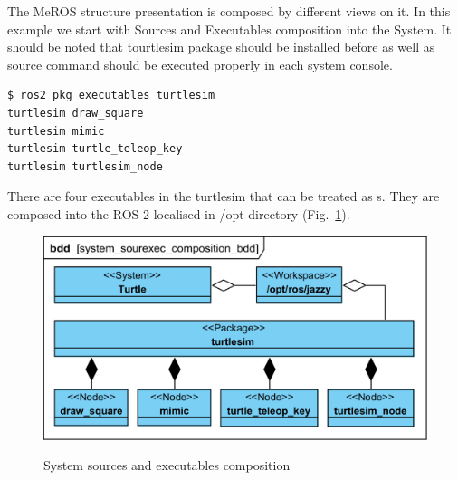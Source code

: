 \documentclass[11pt,oneside,a4paper]{report}
\begin{document}
The MeROS \stSystem{} structure presentation is composed by different views on it. In this example we start with Sources and Executables composition into the System. It should be noted that tourtlesim package should be installed before as well as  source command should be executed properly in each system console.

\begin{lstlisting}[style=terminal]
$ ros2 pkg executables turtlesim
turtlesim draw_square
turtlesim mimic
turtlesim turtle_teleop_key
turtlesim turtlesim_node
\end{lstlisting}

There are four executables in the turtlesim \stPackage{} that can be treated as \stNode{}s. They are composed into the ROS 2 \stWorkspace{} localised in /opt directory (Fig.~\ref{fig:system_sourexec_composition_bdd}).


\begin{figure}[H]
	\centering
	\begin{center}
		{\includegraphics[scale=1.0]{diagrams/system_sourexec_composition_bdd.png}}
	\end{center}
	\caption{System sources and executables composition}
	\label{fig:system_sourexec_composition_bdd}
\end{figure}


			
\AtNextBibliography{\small}
\printbibliography
	
\end{document}
